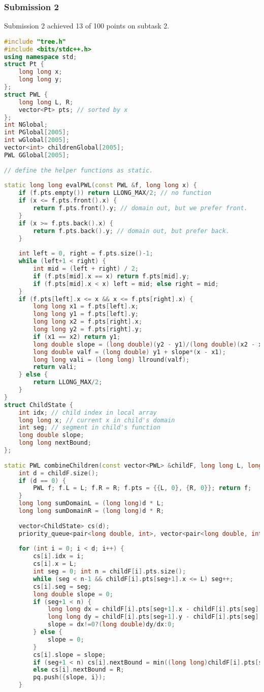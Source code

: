 \subsubsection{Submission 2}
Submission 2 achieved 13 of 100 points on subtask 2.
\begin{lstlisting}[language=C++]
#include "tree.h"
#include <bits/stdc++.h>
using namespace std;
struct Pt {
    long long x;
    long long y;
};
struct PWL {
    long long L, R;
    vector<Pt> pts; // sorted by x
};
int NGlobal;
int PGlobal[2005];
int wGlobal[2005];
vector<int> childrenGlobal[2005];
PWL GGlobal[2005];
 
// define the helper functions as static.
 
static long long evalPWL(const PWL &f, long long x) {
    if (f.pts.empty()) return LLONG_MAX/2; // no function
    if (x <= f.pts.front().x) {
        return f.pts.front().y; // domain out, but we prefer front.
    }
    if (x >= f.pts.back().x) {
        return f.pts.back().y; // domain out, but prefer back.
    }
 
    int left = 0, right = f.pts.size()-1;
    while (left+1 < right) {
        int mid = (left + right) / 2;
        if (f.pts[mid].x == x) return f.pts[mid].y;
        if (f.pts[mid].x < x) left = mid; else right = mid;
    }
    if (f.pts[left].x <= x && x <= f.pts[right].x) {
        long long x1 = f.pts[left].x;
        long long y1 = f.pts[left].y;
        long long x2 = f.pts[right].x;
        long long y2 = f.pts[right].y;
        if (x1 == x2) return y1;
        long double slope = (long double)(y2 - y1)/(long double)(x2 - x1);
        long double valf = (long double) y1 + slope*(x - x1);
        long long vali = (long long) llround(valf);
        return vali;
    } else {
        return LLONG_MAX/2;
    }
}
struct ChildState {
    int idx; // child index in local array
    long long x; // current x in child's domain
    int seg; // segment in child's function
    long double slope;
    long long nextBound;
};
 
static PWL combineChildren(const vector<PWL> &childF, long long L, long long R) {
    int d = childF.size();
    if (d == 0) {
        PWL f; f.L = L; f.R = R; f.pts = {{L, 0}, {R, 0}}; return f;
    }
    long long sumDomainL = (long long)d * L;
    long long sumDomainR = (long long)d * R;
 
    vector<ChildState> cs(d);
    priority_queue<pair<long double, int>, vector<pair<long double, int>>, greater<pair<long double, int>>> pq;
 
    for (int i = 0; i < d; i++) {
        cs[i].idx = i;
        cs[i].x = L;
        int seg = 0; int n = childF[i].pts.size();
        while (seg < n-1 && childF[i].pts[seg+1].x <= L) seg++;
        cs[i].seg = seg;
        long double slope = 0;
        if (seg+1 < n) {
            long long dx = childF[i].pts[seg+1].x - childF[i].pts[seg].x;
            long long dy = childF[i].pts[seg+1].y - childF[i].pts[seg].y;
            slope = dx!=0?(long double)dy/dx:0;
        } else {
            slope = 0;
        }
        cs[i].slope = slope;
        if (seg+1 < n) cs[i].nextBound = min((long long)childF[i].pts[seg+1].x, R);
        else cs[i].nextBound = R;
        pq.push({slope, i});
    }
 

\end{lstlisting}

